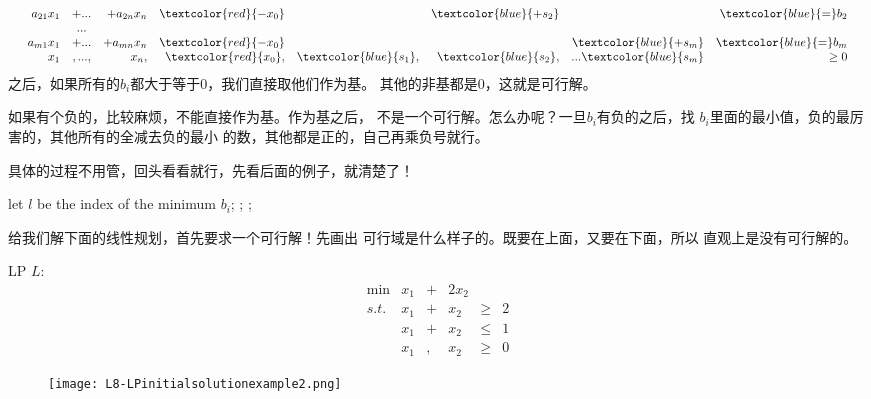 {{\[\begin{array}{rrcrrrrrrrrrl}
	& a_{21}x_1 &+ ... &+a_{2n}x_n    &\textcolor{red}{-x_0}&         &\textcolor{blue}{+s_2}&         &\textcolor{blue}{=}  b_2 &  \\
	&           & ... &                                       &  &     &    &  &  &\\
	& a_{m1}x_1 &+ ... &+a_{mn}x_n &\textcolor{red}{-x_0}&          &        &     \textcolor{blue}{+s_m}     &\textcolor{blue}{=}  b_m &  \\
	&         x_1  &, ... ,&       x_n,          &\textcolor{red}{x_0},& \textcolor{blue}{s_1},   &\textcolor{blue}{s_2}, & ...    \textcolor{blue}{s_m}   &  \geq  0   &  \\
	\end{array} \nonumber
	\]
}
{
	之后，如果所有的$b_i$都大于等于0，我们直接取他们作为基。
	其他的非基都是0，这就是可行解。
}
{
	如果有个负的，比较麻烦，不能直接作为基。作为基之后，
	不是一个可行解。怎么办呢？一旦$b_i$有负的之后，找
	$b_i$里面的最小值，负的最厉害的，其他所有的全减去负的最小
	的数，其他都是正的，自己再乘负号就行。

}
{
	具体的过程不用管，回头看看就行，先看后面的例子，就清楚了！
}
{


		\begin{algorithmic}[1]
			\begin{footnotesize}
				\STATE let $l$ be the index of the minimum $b_i$;
				;
				\ENDIF
				\STATE{\textcolor{red}{//perform one step of pivot to make all $b_i$ positive; }};
				\ELSE
				\ENDIF
			\end{footnotesize}
		\end{algorithmic}

}
{
	给我们解下面的线性规划，首先要求一个可行解！先画出
	可行域是什么样子的。既要在上面，又要在下面，所以
	直观上是没有可行解的。
}
{

		\begin{small}
			LP $L$:
			\[
			\begin{array}{rrrrrrl}
			\min &   x_1 & + & 2 x_2 & \\
			s.t. &   x_1 & + & x_2 & \geq & 2   \\
			&    x_1 & + & x_2 & \leq & 1   \\
			&   x_1 &,& x_2 & \geq & 0
			\end{array} \nonumber
			\]
		\end{small}
		\begin{figure}
			\texttt{[image: L8-LPinitialsolutionexample2.png]}
		\end{figure}

}}
